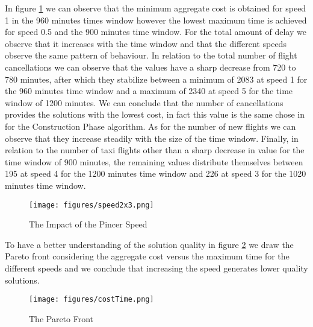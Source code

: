 In figure \ref{fig:speed} we can observe that the minimum aggregate cost is obtained for speed 1 in the 960 minutes times window however the lowest maximum time is achieved for speed 0.5 and the 900 minutes time window. For the total amount of delay we observe that it increases with the time window and that the different speeds observe the same pattern of behaviour. In relation to the total number of flight cancellations we can observe that the values have a sharp decrease from 720 to 780 minutes, after which they stabilize between a minimum of 2083 at speed 1 for the 960 minutes time window  and a maximum of 2340 at speed 5 for the time window of 1200 minutes. We can conclude that the number of cancellations provides the solutions with the lowest cost, in fact this value is the same chose in \citep{bisaillon2011} for the Construction Phase algorithm. As for the number of new flights we can observe that they increase steadily with the size of the time window. Finally, in relation to the number of taxi flights other than a sharp decrease in value for the time window of 900 minutes, the remaining values distribute themselves between 195 at speed 4 for the 1200 minutes time window and 226 at speed 3 for the 1020 minutes time window.
 
	\begin{figure}[h!]
		\centering
		\texttt{[image: figures/speed2x3.png]}
		\caption[]{The Impact of the Pincer Speed}
		\label{fig:speed}
	\end{figure}

To have a better understanding of the solution quality in figure \ref{fig:costTime} we draw the Pareto front considering the aggregate cost versus the maximum time for the different speeds and we conclude that increasing the speed generates lower quality solutions.

	\begin{figure}[h!]
		\centering
		\texttt{[image: figures/costTime.png]}
		\caption[]{The Pareto Front}
		\label{fig:costTime}
	\end{figure}


